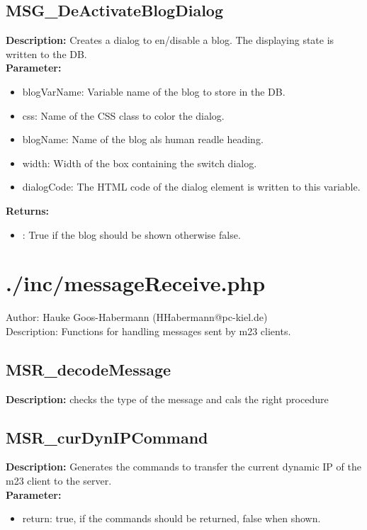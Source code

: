 \subsection{MSG\_DeActivateBlogDialog}
\textbf{Description:} Creates a dialog to en/disable a blog. The displaying state is written to the DB.\\
\textbf{Parameter:}
\begin{itemize}
\item blogVarName: Variable name of the blog to store in the DB.
\item css: Name of the CSS class to color the dialog.
\item blogName: Name of the blog als human readle heading.
\item width: Width of the box containing the switch dialog.
\item dialogCode: The HTML code of the dialog element is written to this variable.
\end{itemize}
\textbf{Returns:}
\begin{itemize}
\item : True if the blog should be shown otherwise false.
\end{itemize}

\newpage\section{./inc/messageReceive.php}
 Author: Hauke Goos-Habermann (HHabermann@pc-kiel.de)\\
 Description: Functions for handling messages sent by m23 clients.\\

\subsection{MSR\_decodeMessage}
\textbf{Description:} checks the type of the message and cals the right procedure\\

\subsection{MSR\_curDynIPCommand}
\textbf{Description:} Generates the commands to transfer the current dynamic IP of the m23 client to the server.\\
\textbf{Parameter:}
\begin{itemize}
\item return: true, if the commands should be returned, false when shown.
\end{itemize}

